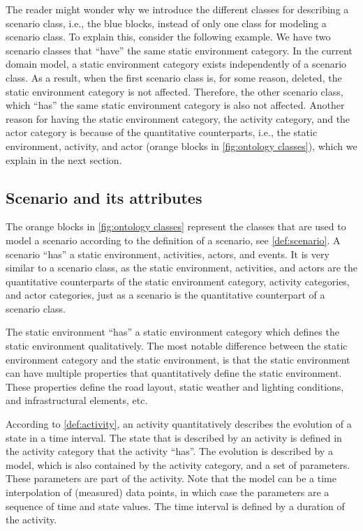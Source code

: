 The reader might wonder why we introduce the different classes for describing a scenario class, i.e., the blue blocks, instead of only one class for modeling a scenario class. To explain this, consider the following example. We have two scenario classes that ``have'' the same static environment category. In the current domain model, a static environment category exists independently of a scenario class. As a result, when the first scenario class is, for some reason, deleted, the static environment category is not affected. Therefore, the other scenario class, which ``has'' the same static environment category is also not affected. Another reason for having the static environment category, the activity category, and the actor category is because of the quantitative counterparts, i.e., the static environment, activity, and actor (orange blocks in \cref{fig:ontology classes}), which we explain in the next section.



\subsection{Scenario and its attributes}
\label{sec:domain scenario}

The orange blocks in \cref{fig:ontology classes} represent the classes that are used to model a scenario according to the definition of a scenario, see \cref{def:scenario}. A scenario ``has'' a static environment, activities, actors, and events. It is very similar to a scenario class, as the static environment, activities, and actors are the quantitative counterparts of the static environment category, activity categories, and actor categories, just as a scenario is the quantitative counterpart of a scenario class. 

The static environment ``has'' a static environment category which defines the static environment qualitatively. The most notable difference between the static environment category and the static environment, is that the static environment can have multiple properties that quantitatively define the static environment. These properties define the road layout, static weather and lighting conditions, and infrastructural elements, etc.

According to \cref{def:activity}, an activity quantitatively describes the evolution of a state in a time interval. The state that is described by an activity is defined in the activity category that the activity ``has''. The evolution is described by a model, which is also contained by the activity category, and a set of parameters. These parameters are part of the activity. Note that the model can be a time interpolation of (measured) data points, in which case the parameters are a sequence of time and state values. The time interval is defined by a duration of the activity.

